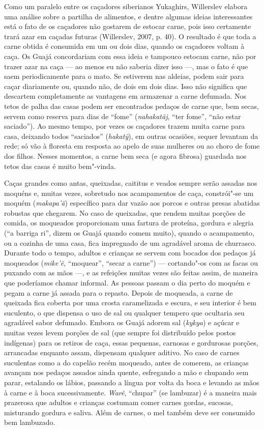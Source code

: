 Como um paralelo entre os caçadores siberianos Yukaghirs, Willerslev
elabora uma análise sobre a partilha de alimentos, e dentre algumas
ideias interessantes está o fato de os caçadores não gostarem de estocar
carne, pois isso certamente trará azar em caçadas futuras (Willerslev,
2007, p. 40). O resultado é que toda a carne obtida é consumida em um ou
dois dias, quando os caçadores voltam à caça. Os Guajá concordariam com
essa ideia e tampouco estocam carne, não por trazer azar na caça --- ao
menos eu não saberia dizer isso ---, mas o fato é que saem periodicamente
para o mato. Se estiverem nas aldeias, podem sair para caçar diariamente
ou, quando não, de dois em dois dias. Isso não significa que descartem
completamente as vantagens em armazenar a carne defumada. Nos tetos de
palha das casas podem ser encontrados pedaços de carne que, bem secas,
servem como reserva para dias de ``fome'' (\emph{nahakatãj}, ``ter
fome'', ``não estar saciado''). Ao mesmo tempo, por vezes os caçadores
trazem muita carne para casa, deixando todos ``saciados''
(\emph{hakatỹ}), em outras ocasiões, sequer levantam da rede; só vão à
floresta em resposta ao apelo de suas mulheres ou ao choro de fome dos
filhos. Nesses momentos, a carne bem seca (e agora fibrosa) guardada nos
tetos das casas é muito bem"-vinda.

Caças grandes como antas, queixadas, caititus e veados sempre serão
assadas nos moquéns e, muitas vezes, sobretudo nos acampamentos de caça,
constrói"-se um moquém (\emph{makapa'ã}) específico para dar vazão aos
porcos e outras presas abatidas robustas que chegarem. No caso de
queixadas, que rendem muitas porções de comida, os moqueados
proporcionam uma fartura de proteína, gordura e alegria (``a barriga
ri'', dizem os Guajá quando comem muito), quando o acampamento, ou a
cozinha de uma casa, fica impregnado de um agradável aroma de churrasco.
Durante todo o tempo, adultos e crianças se servem com bocados dos
pedaços já moqueados (\emph{mike'ẽ}, ``moquear'', ``secar a carne'') ---
cortando"-os com as facas ou puxando com as mãos ---, e as refeições muitas
vezes são feitas assim, de maneira que poderíamos chamar informal. As
pessoas passam o dia perto do moquém e pegam a carne já assada para o
repasto. Depois de moqueada, a carne de queixada fica coberta por uma
crosta caramelizada e escura, e seu interior é bem suculento, o que
dispensa o uso de sal ou qualquer tempero que ocultaria seu agradável
sabor defumado. Embora os Guajá adorem sal (\emph{kykya}) e açúcar e
muitas vezes levem porções de sal (que sempre foi distribuído pelos
postos indígenas) para os retiros de caça, essas pequenas, carnosas e
gordurosas porções, arrancadas enquanto assam, dispensam qualquer
aditivo. No caso de carnes suculentas como a do capelão recém moqueado,
antes de comerem, as crianças avançam nos pedaços assados ainda quente,
esfregando a mão e chupando sem parar, estalando os lábios, passando a
língua por volta da boca e levando as mãos à carne e à boca
sucessivamente. \emph{Warê}, ``chupar'' (se lambuzar) é a maneira mais
prazerosa que adultos e crianças costumam comer carnes gordas, sucosas,
misturando gordura e saliva. Além de carnes, o mel também deve ser
consumido bem lambuzado.

